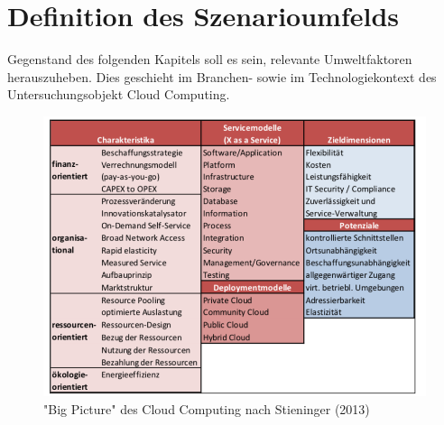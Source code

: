 \section{Definition des Szenarioumfelds}
\label{environment}

Gegenstand des folgenden Kapitels soll es sein, relevante Umweltfaktoren herauszuheben. Dies geschieht  im Branchen- sowie im Technologiekontext des Untersuchungsobjekt Cloud Computing. 


\begin{figure}
	\centering
	\includegraphics[width=\linewidth]{images/bigpicture}
	\caption[Caption for parameters]{ "Big Picture" des Cloud Computing nach Stieninger (2013) \cite{stieninger}}
	\label{fig:bigpicture}
\end{figure}